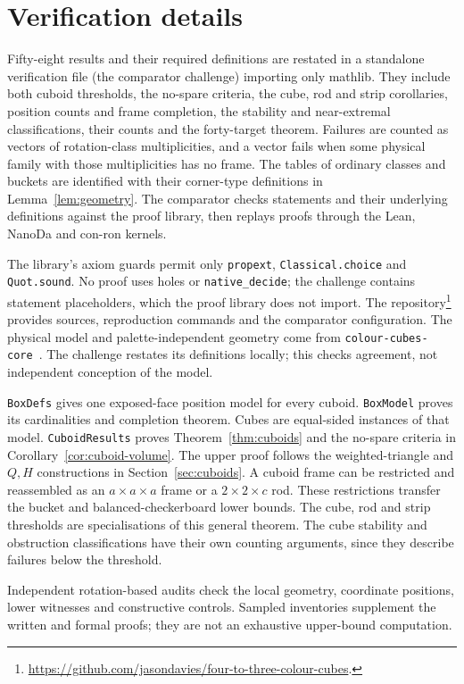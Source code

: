\section{Verification details}\label{app:verification}
Fifty-eight results and their required definitions are restated in a
standalone verification file (the comparator challenge) importing only
mathlib. They include both cuboid thresholds, the no-spare criteria,
the cube, rod and strip corollaries, position counts and frame completion,
the stability and near-extremal classifications, their counts and the
forty-target theorem. Failures are counted as vectors of rotation-class
multiplicities, and a vector fails when some physical family with those
multiplicities has no frame. The tables of ordinary classes and buckets
are identified with their corner-type definitions in
Lemma~\ref{lem:geometry}. The comparator checks statements and their
underlying definitions against the proof library, then replays proofs
through the Lean, NanoDa and con-ron kernels.

The library's axiom guards permit only \texttt{propext},
\texttt{Classical.choice} and \texttt{Quot.sound}. No proof uses holes or
\texttt{native\_decide}; the challenge contains statement placeholders,
which the proof library does not import. The repository\footnote{\url{https://github.com/jasondavies/four-to-three-colour-cubes}.}
provides sources, reproduction commands and the comparator configuration.
The physical model and palette-independent geometry come from
\texttt{colour-cubes-core}~\cite{ColourCubes}. The challenge restates its
definitions locally; this checks agreement, not independent conception
of the model.

\texttt{BoxDefs} gives one exposed-face position model for every cuboid.
\texttt{BoxModel} proves its cardinalities and completion theorem.
Cubes are equal-sided instances of that model.
\texttt{CuboidResults} proves Theorem~\ref{thm:cuboids} and the no-spare
criteria in Corollary~\ref{cor:cuboid-volume}. The upper proof follows the
weighted-triangle and $Q,H$ constructions in Section~\ref{sec:cuboids}.
A cuboid frame can be restricted and reassembled as an $a\times a\times a$
frame or a $2\times2\times c$ rod. These restrictions transfer the bucket
and balanced-checkerboard lower bounds. The cube, rod and strip thresholds
are specialisations of this general theorem.
The cube stability and obstruction classifications have their own
counting arguments, since they describe failures below the threshold.

Independent rotation-based audits check the local geometry, coordinate
positions, lower witnesses and constructive controls. Sampled inventories
supplement the written and formal proofs; they are not an exhaustive
upper-bound computation.
